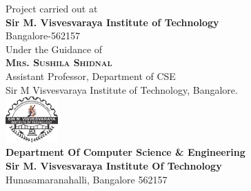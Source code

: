 \begin{titlepage}
	\large{Project carried out at\\
		\textbf{Sir M. Visvesvaraya Institute of Technology}
		\\Bangalore-562157
	}\\[10pt]
	\large{Under the Guidance of\\
		\textbf{\textsc{\large Mrs. Sushila Shidnal }}\\
		Assistant Professor, Department of CSE\\
		Sir M Visvesvaraya Institute of Technology, Bangalore.
	}\\[10pt]
	\includegraphics[width=0.15\textwidth]{images/mvit.png}\\[10pt] 
	\large{
		\textbf{Department Of Computer Science \& Engineering}\\
		\textbf{Sir M. Visvesvaraya Institute Of Technology}\\
		Hunasamaranahalli, Bangalore 562157\\
	}

\end{titlepage}

